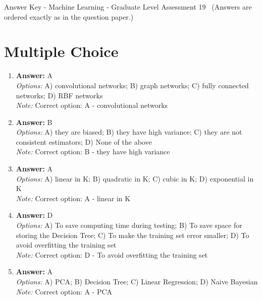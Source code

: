 \documentclass[12pt]{article}
\begin{document}
\begin{center}
Answer Key - Machine Learning - Graduate Level Assessment 19 \
\small (Answers are ordered exactly as in the question paper.)
\end{center}

\section*{Multiple Choice}
\begin{enumerate}[label=\arabic*.]
\item \textbf{Answer:} A
\\ \textit{Options:} A) convolutional networks; B) graph networks; C) fully connected networks; D) RBF networks
\\ \textit{Note:} Correct option: A - convolutional networks
\item \textbf{Answer:} B
\\ \textit{Options:} A) they are biased; B) they have high variance; C) they are not consistent estimators; D) None of the above
\\ \textit{Note:} Correct option: B - they have high variance
\item \textbf{Answer:} A
\\ \textit{Options:} A) linear in K; B) quadratic in K; C) cubic in K; D) exponential in K
\\ \textit{Note:} Correct option: A - linear in K
\item \textbf{Answer:} D
\\ \textit{Options:} A) To save computing time during testing; B) To save space for storing the Decision Tree; C) To make the training set error smaller; D) To avoid overfitting the training set
\\ \textit{Note:} Correct option: D - To avoid overfitting the training set
\item \textbf{Answer:} A
\\ \textit{Options:} A) PCA; B) Decision Tree; C) Linear Regression; D) Naive Bayesian
\\ \textit{Note:} Correct option: A - PCA
\end{enumerate}
\end{document}
